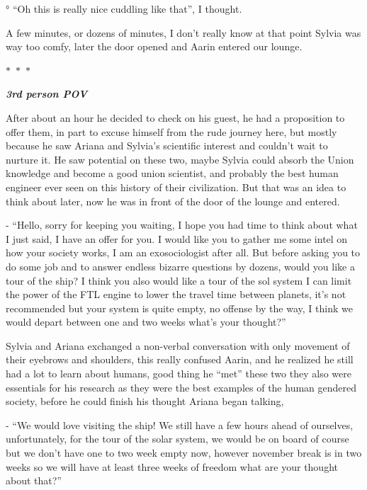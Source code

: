 \documentclass[hidelinks,12pt,a4paper]{book}
\newcommand\sep{\begin{center}
  $\ast$~$\ast$~$\ast$
\end{center}}
\begin{document}
° “Oh this is really nice cuddling like that”, I thought.\par
\bigskip

A few minutes, or dozens of minutes, I don't really know at that point Sylvia was way too comfy, later the door opened 
and Aarin entered our lounge.

\sep

\textit{\textbf{3rd person POV}}

After about an hour he decided to check on his guest, he had a proposition to offer them, 
in part to excuse himself from the rude journey here, but mostly because he saw Ariana and Sylvia's 
scientific interest and couldn't wait to nurture it. He saw potential on these two, maybe Sylvia could absorb the 
Union knowledge and become a good union scientist, and probably the best human engineer ever seen on this history 
of their civilization. But that was an idea to think about later, now he was in front of the door of the lounge and entered.\par
\bigskip

- “Hello, sorry for keeping you waiting, I hope you had time to think about what I just said,
 I have an offer for you. I would like you to gather me some intel on how your society works, I am an exosociologist
  after all. But before asking you to do some job and to answer endless bizarre questions by dozens, would you like 
  a tour of the ship? I think you also would like a tour of the sol system I can limit the power of the FTL engine 
  to lower the travel time between planets, it's not recommended but your system is quite empty, no offense by the way, 
  I think we would depart between one and two weeks what's your thought?”\par
  \bigskip

Sylvia and Ariana exchanged a non-verbal conversation with only movement of their eyebrows and shoulders, this really 
confused Aarin, and he realized he still had a lot to learn about humans, good thing he “met” these two they also 
were essentials for his research as they were the best examples of the human gendered society, before he could 
finish his thought Ariana began talking,\par
\bigskip

- “We would love visiting the ship! We still have a few hours ahead of ourselves, unfortunately, for the tour of
 the solar system, we would be on board of course but we don't have one to two week empty now, however november 
 break is in two weeks so we will have at least three weeks of freedom what are your thought about that?”\par
 \bigskip
\end{document}
